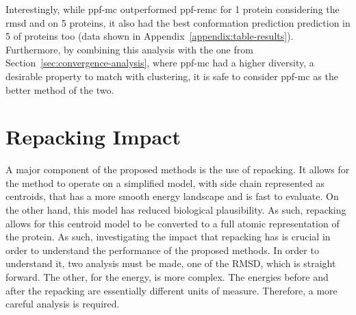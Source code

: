 Interestingly, while ppf-mc outperformed ppf-remc for 1 protein considering
the rmsd and on 5 proteins, it also had the best conformation prediction
prediction in 5 of proteins too (data shown in Appendix~\ref{appendix:table-results}).
Furthermore, by combining this analysis with the one
from Section~\ref{sec:convergence-analysis}, where ppf-mc had a higher
diversity, a desirable property to match with clustering, it is safe to consider
ppf-mc as the better method of the two.

\section{Repacking Impact} \label{sec:repacking-impact}

A major component of the proposed methods is the use of repacking. It allows for
the method to operate on a simplified model, with side chain represented as
centroids, that has a more smooth energy landscape and is fast to evaluate. On
the other hand, this model has reduced biological plausibility. As such,
repacking allows for this centroid model to be converted to a full atomic
representation of the protein. As such, investigating the impact that repacking
has is crucial in order to understand the performance of the proposed methods.
In order to understand it, two analysis must be made, one of the RMSD, which is
straight forward. The other, for the energy, is more complex. The energies before
and after the repacking are essentially different units of measure. Therefore, a
more careful analysis is required.

